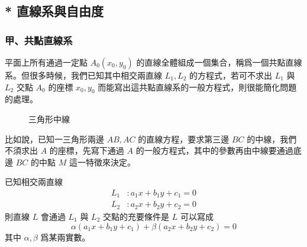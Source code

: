 \subsection{* 直線系與自由度}
\label{sec:4-6}

\subsubsection*{甲、共點直線系}

平面上所有通過一定點 $A_0(x_0, y_0)$ 的直線全體組成一個集合，稱爲一個共點直線系。但很多時候，我們已知其中相交兩直線 $L_1, L_2$ 的方程式，若可不求出 $L_1$ 與 $L_2$ 交點 $A_0$ 的座標 $x_0, y_0$ 而能寫出這共點直線系的一般方程式，則很能簡化問題的處理。

\begin{figure}[H]
\centering
{}
\caption{三角形中線}
\label{fig:4-44}
\end{figure}

比如說，已知一三角形兩邊 $AB, AC$ 的直線方程，要求第三邊 $BC$ 的中線，我們不須求出 $A$ 的座標，先寫下通過 $A$ 的一般方程式，其中的參數再由中線要通過底邊 $BC$ 的中點 $M$ 這一特徵來決定。

\begin{theorem}
已知相交兩直線
\begin{align*}
L_1 &: a_1 x + b_1 y + c_1 = 0 \\
L_2 &: a_2 x + b_2 y + c_2 = 0
\end{align*}
則直線 $L$ 會通過 $L_1$ 與 $L_2$ 交點的充要條件是 $L$ 可以寫成
\begin{equation}
\alpha(a_1 x + b_1 y + c_1) + \beta(a_2 x + b_2 y + c_2) = 0
\label{eq:b3-4-36}
\end{equation}
其中 $\alpha, \beta$ 爲某兩實數。
\end{theorem}

